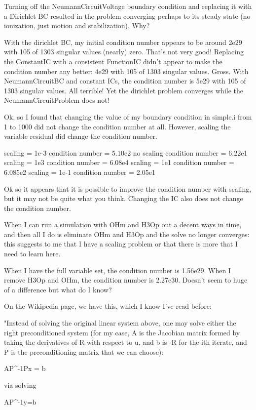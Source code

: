 {Turning off the NeumannCircuitVoltage boundary condition and replacing it with a Dirichlet BC resulted in the problem converging perhaps to its steady state (no ionization, just motion and stabilization). Why?

With the dirichlet BC, my initial condition number appears to be around 2e29 with 105 of 1303 singular values (nearly) zero. That's not very good! Replacing the ConstantIC with a consistent FunctionIC didn't appear to make the condition number any better: 4e29 with 105 of 1303 singular values. Gross. With NeumannCircuitBC and constant ICs, the condition number is 5e29 with 105 of 1303 singular values. All terrible! Yet the dirichlet problem converges while the NeumannCircuitProblem does not!

Ok, so I found that changing the value of my boundary condition in simple.i from 1 to 1000 did not change the condition number at all. However, scaling the variable residual did change the condition number.

scaling = 1e-3  condition number = 5.10e2
no scaling 	condition number = 6.22e1
scaling = 1e3	condition number = 6.08e4
scaling = 1e1 	condition number = 6.085e2
scaling = 1e-1	condition number = 2.05e1

Ok so it appears that it is possible to improve the condition number with scaling, but it may not be quite what you think. Changing the IC also does not change the condition number.

When I can run a simulation with OHm and H3Op out a decent ways in time, and then all I do is eliminate OHm and H3Op and the solve no longer converges: this suggests to me that I have a scaling problem or that there is more that I need to learn here.

When I have the full variable set, the condition number is 1.56e29. When I remove H3Op and OHm, the condition number is 2.27e30. Doesn't seem to huge of a difference but what do I know?

On the Wikipedia page, we have this, which I know I've read before:

"Instead of solving the original linear system above, one may solve either the right preconditioned system (for my case, A is the Jacobian matrix formed by taking the derivatives of R with respect to u, and b is -R for the ith iterate, and P is the preconditioning matrix that we can choose):

    AP^{-1}Px = b

via solving

    AP^{-1}y=b

}
